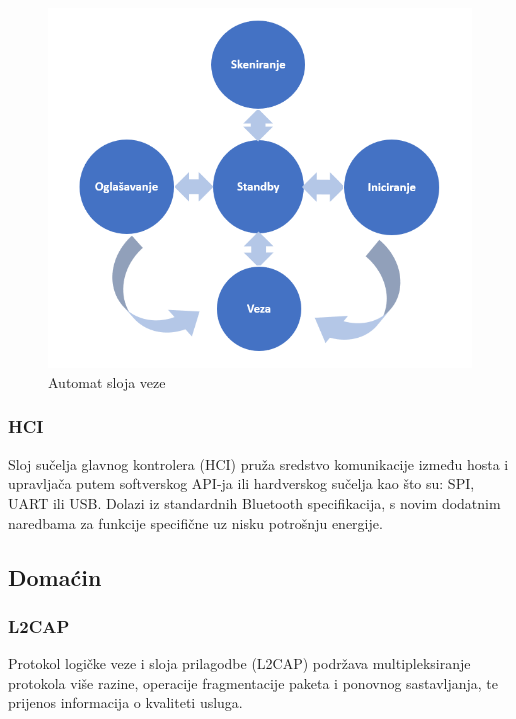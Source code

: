 \begin{figure}[ht]
	\centering
	\includegraphics[]{imgs/ll_state_machine}
	\caption{Automat sloja veze}
	\label{fig:ll-state-machine}
\end{figure}

\subsubsection{HCI}
Sloj sučelja glavnog kontrolera (HCI) pruža sredstvo komunikacije između hosta i upravljača  putem softverskog API-ja ili hardverskog sučelja kao što su: SPI, UART ili USB. Dolazi iz standardnih Bluetooth specifikacija, s novim dodatnim naredbama za funkcije specifične uz nisku potrošnju energije.

\subsection{Domaćin}

\subsubsection{L2CAP}
Protokol logičke veze i sloja prilagodbe (L2CAP) podržava multipleksiranje protokola više razine, operacije fragmentacije paketa i ponovnog sastavljanja, te prijenos informacija o kvaliteti usluga.

